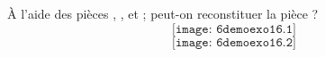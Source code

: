 \`A l'aide des pièces , ,  et
  ; peut-on reconstituer la pièce  ?
  \[\texttt{[image: 6demoexo16.1]}\]
  \[\texttt{[image: 6demoexo16.2]}\]